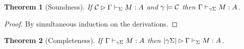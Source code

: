 \documentclass[11pt]{article}
\newtheorem{theorem}{Theorem}[section]
\begin{document}
\begin{theorem}[Soundness]
    If $\mathcal C\rhd{}\Gamma\vdash_{\Sigma}M:A$ and $\gamma\models\mathcal C$ then $\Gamma\vdash_{\gamma\Sigma}M:A$.
\end{theorem}

\begin{proof}
    By simultaneous induction on the derivations.
\end{proof}

\begin{theorem}[Completeness]
    If $\Gamma\vdash_{\gamma\Sigma}M:A$ then $\left|\gamma\Sigma\right|\rhd{}\Gamma\vdash_{\Sigma}M:A$.
\end{theorem}
\end{document}
